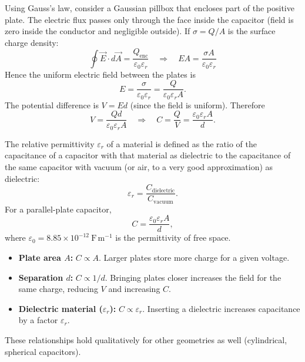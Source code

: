 \documentclass[11pt]{article}
\newcommand{\cle}[1]{{\popxbold\color{popdark}#1}}
\begin{document}
\begin{propriete}
Using Gauss's law, consider a Gaussian pillbox that encloses part of the positive plate. The electric flux passes only through the face inside the capacitor (field is zero inside the conductor and negligible outside). If $\sigma = Q/A$ is the surface charge density:
\[
\oint \vec{E} \cdot d\vec{A} = \frac{Q_{\text{enc}}}{\varepsilon_0 \varepsilon_r} \quad\Longrightarrow\quad E A = \frac{\sigma A}{\varepsilon_0 \varepsilon_r}
\]
Hence the uniform electric field between the plates is
\[
E = \frac{\sigma}{\varepsilon_0 \varepsilon_r} = \frac{Q}{\varepsilon_0 \varepsilon_r A}.
\]
The potential difference is $V = E d$ (since the field is uniform). Therefore
\[
V = \frac{Q d}{\varepsilon_0 \varepsilon_r A} \quad\Longrightarrow\quad
C = \frac{Q}{V} = \frac{\varepsilon_0 \varepsilon_r A}{d}.
\]
\end{propriete}

\begin{definition}
The \cle{relative permittivity} $\varepsilon_r$ of a material is defined as the ratio of the capacitance of a capacitor with that material as dielectric to the capacitance of the same capacitor with vacuum (or air, to a very good approximation) as dielectric:
\[
\varepsilon_r = \frac{C_{\text{dielectric}}}{C_{\text{vacuum}}}.
\]
For a parallel-plate capacitor,
\[
C = \frac{\varepsilon_0 \varepsilon_r A}{d},
\]
where $\varepsilon_0 = 8.85 \times 10^{-12}\ \mathrm{F\,m^{-1}}$ is the permittivity of free space.
\end{definition}

\begin{propriete}
\begin{itemize}
    \item \textbf{Plate area $A$:} $C \propto A$. Larger plates store more charge for a given voltage.
    \item \textbf{Separation $d$:} $C \propto 1/d$. Bringing plates closer increases the field for the same charge, reducing $V$ and increasing $C$.
    \item \textbf{Dielectric material ($\varepsilon_r$):} $C \propto \varepsilon_r$. Inserting a dielectric increases capacitance by a factor $\varepsilon_r$.
\end{itemize}
These relationships hold qualitatively for other geometries as well (cylindrical, spherical capacitors).
\end{propriete}
\end{document}
